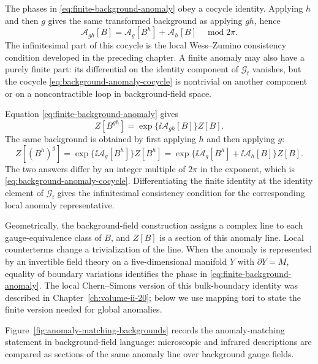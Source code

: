 \begin{remark}
\label{rem:wess-zumino-consistency-from-cocycle}
The phases in \eqref{eq:finite-background-anomaly} obey a cocycle identity.
Applying \(h\) and then \(g\) gives the same transformed background as applying
\(gh\), hence
\begin{equation}
  \mathcal A_{gh}[B]
  =
  \mathcal A_g[B^h]+\mathcal A_h[B]
  \quad
  \operatorname{mod} 2\pi .
  \label{eq:background-anomaly-cocycle}
\end{equation}
The infinitesimal part of this cocycle is the local Wess--Zumino consistency
condition developed in the preceding chapter.  A finite anomaly may also have a
purely finite part: its differential on the identity component of
\(\mathcal G_{\mathrm f}\) vanishes, but the cocycle
\eqref{eq:background-anomaly-cocycle} is nontrivial on another component or on
a noncontractible loop in background-field space.

Equation \eqref{eq:finite-background-anomaly} gives
\[
  Z[B^{gh}]
  =
  \exp\{\ii\mathcal A_{gh}[B]\}Z[B].
\]
The same background is obtained by first applying \(h\) and then applying
\(g\):
\[
  Z[(B^h)^g]
  =
  \exp\{\ii\mathcal A_g[B^h]\}Z[B^h]
  =
  \exp\{\ii\mathcal A_g[B^h]+\ii\mathcal A_h[B]\}Z[B].
\]
The two answers differ by an integer multiple of \(2\pi\) in the exponent,
which is \eqref{eq:background-anomaly-cocycle}.  Differentiating the finite
identity at the identity element of \(\mathcal G_{\mathrm f}\) gives the
infinitesimal consistency condition for the corresponding local anomaly
representative.
\end{remark}

Geometrically, the background-field construction assigns a complex line to each
gauge-equivalence class of \(B\), and \(Z[B]\) is a section of this anomaly
line.  Local counterterms change a trivialization of the line.  When the anomaly is
represented by an invertible field theory on a five-dimensional manifold \(Y\)
with \(\partial Y=M\), equality of boundary variations identifies the phase in
\eqref{eq:finite-background-anomaly}.  The local Chern--Simons version of this
bulk-boundary identity was described in Chapter~\ref{ch:volume-ii-20}; below
we use mapping tori to state the finite version needed for global anomalies.

Figure~\ref{fig:anomaly-matching-backgrounds} records the anomaly-matching
statement in background-field language: microscopic and infrared descriptions
are compared as sections of the same anomaly line over background gauge fields.

